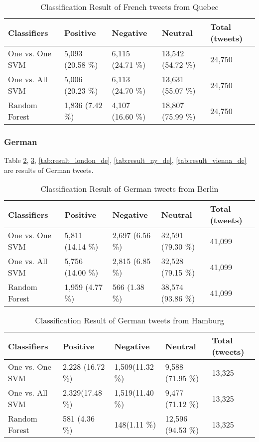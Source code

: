 \begin{table}[ht]
	\caption{Classification Result of French tweets from Quebec}
	\begin{tabular}{|l|p{1.8cm}|p{1.8cm}|p{1.8cm}|p{1.8cm}|} \hline
	Classifiers & Positive & Negative & Neutral & Total (tweets)\\ \hline
	
	One vs. One SVM & 5,093 (20.58 \%)& 6,115 (24.71 \%)& 13,542 (54.72 \%)& 24,750 \\ \hline
	One vs. All SVM & 5,006 (20.23 \%)& 6,113 (24.70 \%)& 13,631 (55.07 \%)& 24,750 \\ \hline
	Random Forest   & 1,836 (7.42 \%)& 4,107 (16.60 \%)& 18,807 (75.99 \%)& 24,750 \\ \hline
	\end{tabular}
	\label{tab:result_quebec_fr}
\end{table}

\begin{comment}
London
N.Y or San Francisco

\end{comment}

\clearpage
\subsubsection{German}
Table \ref{tab:result_berlin_de}, \ref{tab:result_hamburg_de}, \ref{tab:result_london_de}, \ref{tab:result_ny_de}, \ref{tab:result_vienna_de} are results of German tweets.
\begin{table}[ht]
	\caption{Classification Result of German tweets from Berlin}
	\begin{tabular}{|l|p{1.8cm}|p{1.8cm}|p{1.8cm}|p{1.8cm}|} \hline
	Classifiers & Positive & Negative & Neutral & Total (tweets)\\ \hline
One vs. One SVM & 5,811 (14.14 \%) & 2,697 (6.56 \%)  & 32,591 (79.30 \%)& 41,099\\ \hline
One vs. All SVM & 5,756 (14.00 \%) & 2,815 (6.85 \%) & 32,528 (79.15 \%) & 41,099 \\ \hline
Random Forest   & 1,959 (4.77 \%) & 566 (1.38 \%) & 38,574 (93.86 \%) & 41,099 \\ \hline
	\end{tabular}
	\label{tab:result_berlin_de}
\end{table}


\begin{table}[ht]
	\caption{Classification Result of German tweets from Hamburg}
	\begin{tabular}{|l|p{1.8cm}|p{1.8cm}|p{1.8cm}|p{1.8cm}|} \hline
	Classifiers & Positive & Negative & Neutral & Total (tweets)\\ \hline
One vs. One SVM & 2,228 (16.72 \%)& 1,509(11.32 \%) & 9,588 (71.95 \%) & 13,325 \\ \hline
One vs. All SVM & 2,329(17.48 \%) & 1,519(11.40 \%) & 9,477 (71.12 \%) & 13,325\\ \hline
Random Forest   & 581 (4.36 \%) & 148(1.11 \%)  & 12,596 (94.53 \%) & 13,325\\ \hline
	\end{tabular}
	\label{tab:result_hamburg_de}
\end{table}

